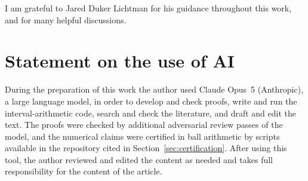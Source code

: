 \documentclass[11pt]{amsart}
\theoremstyle{plain}
\theoremstyle{definition}
\begin{document}
I am grateful to Jared Duker Lichtman for his guidance throughout this work,
and for many helpful discussions.

\section*{Statement on the use of AI}

During the preparation of this work the author used Claude Opus~5 (Anthropic),
a large language model, in order to develop and check proofs, write and run
the interval-arithmetic code, search and check the literature, and draft and
edit the text. The proofs were checked by additional
adversarial review passes of the model, and the numerical claims were
certified in ball arithmetic by scripts available in the repository cited in
Section~\ref{sec:certification}. After using this tool, the author reviewed and edited
the content as needed and takes full responsibility for the content of the
article.
\end{document}
